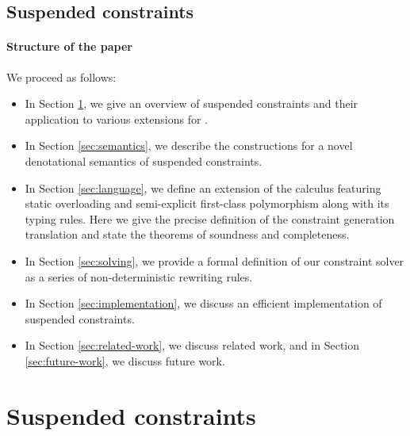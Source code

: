 \documentclass[acmsmall,screen,nonacm]{acmart}
\begin{document}
\subsection {Suspended constraints} 






\paragraph{Structure of the paper} We proceed as follows:
\begin{itemize}
\item In Section \ref{sec:constraints}, we give an overview of suspended constraints and their 
application to various extensions for \ML. 
\item In Section \ref{sec:semantics}, we describe the constructions for a
  novel denotational semantics of suspended constraints.
\item In Section \ref{sec:language}, we define an extension of the \ML calculus featuring
  static overloading and semi-explicit first-class polymorphism along with its typing rules.
  Here we give the precise definition of the constraint generation translation and state the theorems 
  of soundness and completeness. 
\item In Section \ref{sec:solving}, we provide a formal definition of our constraint solver 
  as a series of non-deterministic rewriting rules. 
\item In Section \ref{sec:implementation}, we discuss an efficient implementation of suspended constraints.
\item In Section \ref{sec:related-work}, we discuss related work, and in
  Section \ref{sec:future-work}, we discuss future work.
\end{itemize}

\section{Suspended constraints}
\label{sec:constraints}
\end{document}
